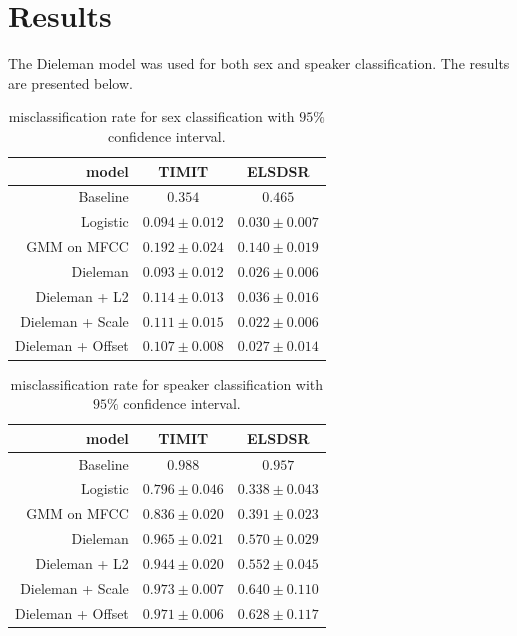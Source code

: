 \section{Results}

The Dieleman model was used for both sex and speaker classification. The results are presented below.

\begin{table}[H]
\centering
\begin{tabular}{r|c|c}
model & TIMIT & ELSDSR \\ \hline
                    Baseline & $0.354$ & $0.465$ \\
                    Logistic & $0.094 \pm 0.012$ & $0.030 \pm 0.007$ \\
                 GMM on MFCC & $0.192 \pm 0.024$ & $0.140 \pm 0.019$ \\
                    Dieleman & $0.093 \pm 0.012$ & $0.026 \pm 0.006$ \\
     Dieleman + L2 & $0.114 \pm 0.013$ & $0.036 \pm 0.016$ \\
  Dieleman + Scale & $0.111 \pm 0.015$ & $0.022 \pm 0.006$ \\
 Dieleman + Offset & $0.107 \pm 0.008$ & $0.027 \pm 0.014$ \\
\end{tabular}
\caption{misclassification rate for sex classification with $95\%$ confidence interval.}
\end{table}

\begin{table}[H]
\centering
\begin{tabular}{r|c|c}
model & TIMIT & ELSDSR \\ \hline
                    Baseline & $0.988$ & $0.957$ \\
                    Logistic & $0.796 \pm 0.046$ & $0.338 \pm 0.043$ \\
                 GMM on MFCC & $0.836 \pm 0.020$ & $0.391 \pm 0.023$ \\
                    Dieleman & $0.965 \pm 0.021$ & $0.570 \pm 0.029$ \\
     Dieleman + L2 & $0.944 \pm 0.020$ & $0.552 \pm 0.045$ \\
  Dieleman + Scale & $0.973 \pm 0.007$ & $0.640 \pm 0.110$ \\
 Dieleman + Offset & $0.971 \pm 0.006$ & $0.628 \pm 0.117$ \\
\end{tabular}
\caption{misclassification rate for speaker classification with $95\%$ confidence interval.}
\end{table}

